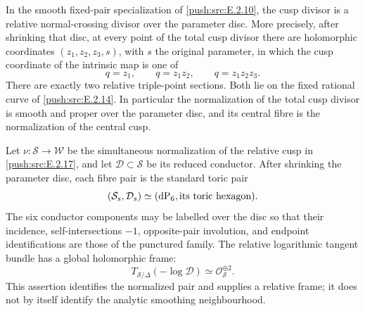 \begin{proposition}\hypertarget{tag-0332}{}\label{push:src:E.2.17}


In the smooth fixed-pair specialization of \ref{push:src:E.2.10},
the cusp divisor is a relative normal-crossing divisor
over the parameter disc.  More precisely, after
shrinking that disc, at every point of the total cusp
divisor there are holomorphic coordinates
$(z_1,z_2,z_3,s)$, with $s$ the original parameter,
in which the cusp coordinate of the intrinsic map is
one of
\[
 q=z_1,\qquad q=z_1z_2,\qquad q=z_1z_2z_3.
 \tag{E.2.17.1}
\]
There are exactly two relative triple-point sections.
Both lie on the fixed rational curve of \ref{push:src:E.2.14}.
In particular the normalization of the total cusp
divisor is smooth and proper over the parameter
disc, and its central fibre is the normalization
of the central cusp.
\end{proposition}

\begin{proposition}\hypertarget{tag-0333}{}\label{push:src:E.2.18}


Let $\nu:\mathcal S\to\mathcal W$ be the
simultaneous normalization of the relative cusp
in \ref{push:src:E.2.17}, and let $\mathcal D\subset\mathcal S$
be its reduced conductor.  After shrinking the
parameter disc, each fibre pair is the standard
toric pair
\[
 (\mathcal S_s,\mathcal D_s)
 \simeq(\mathrm{dP}_6,\hbox{its toric hexagon}).
\]
The six conductor components may be labelled over
the disc so that their incidence, self-intersections
$-1$, opposite-pair involution, and endpoint
identifications are those of the punctured family.
The relative logarithmic tangent bundle has a
global holomorphic frame:
\[
 T_{\mathcal S/\Delta}(-\log\mathcal D)
 \simeq\mathcal O_{\mathcal S}^{\oplus2}.
\]
This assertion identifies the normalized pair
and supplies a relative frame; it does not by
itself identify the analytic smoothing neighbourhood.
\end{proposition}

